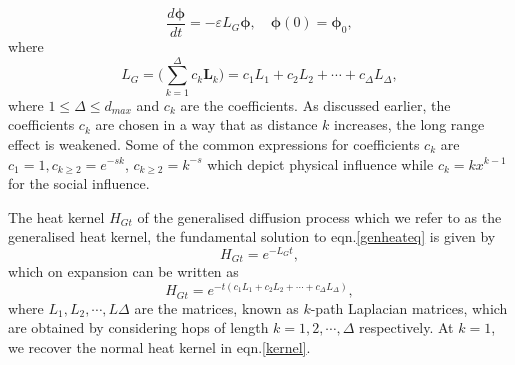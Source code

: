 \documentclass[10pt,a4paper]{article}
\begin{document}
        \begin{equation}
        \frac{d\boldsymbol{\phi}}{dt} =  -\varepsilon L_{G} \boldsymbol{\phi}, \quad \boldsymbol{\phi}(0) = \boldsymbol{\phi}_0 ,
        \label{genheateq}
        \end{equation}
        where
        \begin{equation}
        L_{G} =  \Big(\sum_{k=1}^{\Delta}c_k\mathbf{L}_{k} \Big) = c_{1}L_{1} + c_{2}L_{2} + \cdots + c_{\Delta}L_{\Delta}, 
        \label{}
        \end{equation}
        where $1 \leq \Delta \leq d_{max}$ and $c_k$ are the coefficients. As discussed earlier, 
        the coefficients $c_k$  are chosen in a way that as distance $k$ increases, the long range effect is weakened. Some of the common expressions for coefficients $c_k$ are $c_1 =1, c_{k\geq 2} = e^{-s k}$, $ c_{k\geq 2} =k^{-s}$ which depict physical influence while $c_k = kx^{k-1}$ for the social influence.
        
        The heat kernel $H_{Gt}$ of the generalised diffusion process which we refer to as the generalised heat kernel, the fundamental solution to eqn.\ref{genheateq} is given by 
        \begin{equation}
        H_{Gt} = e^{-L_{G}t},
        \end{equation}
        which on expansion can be written as 
        \begin{equation}
        H_{Gt} = e^{-t(c_{1}L_{1} + c_{2}L_{2} + \cdots + c_{\Delta}L_{\Delta})},
        \end{equation}
        where $L_1, L_2, \cdots, L{\Delta}$ are the matrices, known as $k$-path Laplacian matrices, which are obtained by considering hops of length $k=1,2,\cdots, \Delta$ respectively. At $k=1$, we recover the normal heat kernel in eqn.\ref{kernel}.
\end{document}
